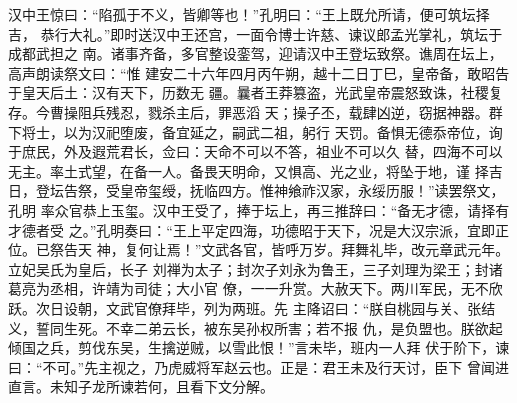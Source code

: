 汉中王惊曰：“陷孤于不义，皆卿等也！”孔明曰：“王上既允所请，便可筑坛择吉，
恭行大礼。”即时送汉中王还宫，一面令博士许慈、谏议郎孟光掌礼，筑坛于成都武担之
南。诸事齐备，多官整设銮驾，迎请汉中王登坛致祭。谯周在坛上，高声朗读祭文曰：“惟
建安二十六年四月丙午朔，越十二日丁巳，皇帝备，敢昭告于皇天后土：汉有天下，历数无
疆。曩者王莽篡盗，光武皇帝震怒致诛，社稷复存。今曹操阻兵残忍，戮杀主后，罪恶滔
天；操子丕，载肆凶逆，窃据神器。群下将士，以为汉祀堕废，备宜延之，嗣武二祖，躬行
天罚。备惧无德忝帝位，询于庶民，外及遐荒君长，佥曰：天命不可以不答，祖业不可以久
替，四海不可以无主。率土式望，在备一人。备畏天明命，又惧高、光之业，将坠于地，谨
择吉日，登坛告祭，受皇帝玺绶，抚临四方。惟神飨祚汉家，永绥历服！”读罢祭文，孔明
率众官恭上玉玺。汉中王受了，捧于坛上，再三推辞曰：“备无才德，请择有才德者受
之。”孔明奏曰：“王上平定四海，功德昭于天下，况是大汉宗派，宜即正位。已祭告天
神，复何让焉！”文武各官，皆呼万岁。拜舞礼毕，改元章武元年。立妃吴氏为皇后，长子
刘禅为太子；封次子刘永为鲁王，三子刘理为梁王；封诸葛亮为丞相，许靖为司徒；大小官
僚，一一升赏。大赦天下。两川军民，无不欣跃。次日设朝，文武官僚拜毕，列为两班。先
主降诏曰：“朕自桃园与关、张结义，誓同生死。不幸二弟云长，被东吴孙权所害；若不报
仇，是负盟也。朕欲起倾国之兵，剪伐东吴，生擒逆贼，以雪此恨！”言未毕，班内一人拜
伏于阶下，谏曰：“不可。”先主视之，乃虎威将军赵云也。正是：君王未及行天讨，臣下
曾闻进直言。未知子龙所谏若何，且看下文分解。
